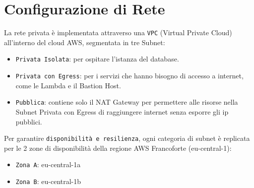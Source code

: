 \section{Configurazione di Rete}

La rete privata è implementata attraverso una \texttt{VPC} (Virtual Private Cloud) all’interno del cloud AWS, segmentata in tre Subnet:

\begin{itemize}
    \item \texttt{Privata Isolata}: per ospitare l’istanza del database.
    \item \texttt{Privata con Egress}: per i servizi che hanno bisogno di accesso a internet, come le Lambda e il Bastion Host.
    \item \texttt{Pubblica}: contiene solo il NAT Gateway per permettere alle risorse nella Subnet Privata con Egress di raggiungere internet senza esporre gli ip pubblici.
\end{itemize}

Per garantire \texttt{disponibilità e resilienza}, ogni categoria di subnet è replicata per le 2 zone di disponibilità della regione AWS Francoforte (eu-central-1):
\begin{itemize}
    \item \texttt{Zona A}: eu-central-1a
    \item \texttt{Zona B}: eu-central-1b
\end{itemize}